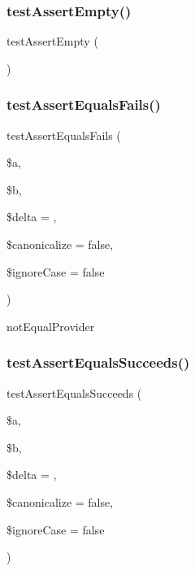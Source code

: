 \subsubsection{\texorpdfstring{test\+Assert\+Empty()}{testAssertEmpty()}}
{\footnotesize\ttfamily test\+Assert\+Empty (\begin{DoxyParamCaption}{ }\end{DoxyParamCaption})}

\mbox{\label{class_framework___assert_test_a152725252589799f3ada3ab42e66dbf2}} 
\subsubsection{\texorpdfstring{test\+Assert\+Equals\+Fails()}{testAssertEqualsFails()}}
{\footnotesize\ttfamily test\+Assert\+Equals\+Fails (\begin{DoxyParamCaption}\item[{}]{\$a,  }\item[{}]{\$b,  }\item[{}]{\$delta = {},  }\item[{}]{\$canonicalize = {\ttfamily false},  }\item[{}]{\$ignore\+Case = {\ttfamily false} }\end{DoxyParamCaption})}

not\+Equal\+Provider \mbox{\label{class_framework___assert_test_aee7c6c7296c8a25bd4b67e019e0c110f}} 
\subsubsection{\texorpdfstring{test\+Assert\+Equals\+Succeeds()}{testAssertEqualsSucceeds()}}
{\footnotesize\ttfamily test\+Assert\+Equals\+Succeeds (\begin{DoxyParamCaption}\item[{}]{\$a,  }\item[{}]{\$b,  }\item[{}]{\$delta = {},  }\item[{}]{\$canonicalize = {\ttfamily false},  }\item[{}]{\$ignore\+Case = {\ttfamily false} }\end{DoxyParamCaption})}

